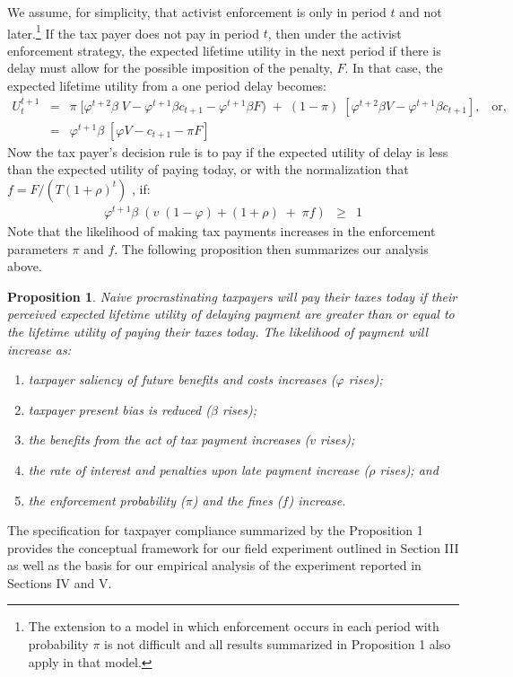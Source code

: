 \documentclass[12pt]{article}
\newtheorem{prop}{Proposition}
\begin{document}
We assume, for simplicity, that activist enforcement is only in period
$t$ and not later.\footnote{The extension to a model in which
  enforcement occurs in each period with probability $\pi$ is not
  difficult and all results summarized in Proposition 1 also apply in
  that model.}  If the tax payer does not pay in period $t$, then
under the activist enforcement strategy, the expected lifetime utility
in the next period if there is delay must allow for the possible
imposition of the penalty, $F$.  In that case, the expected lifetime
utility from a one period delay becomes:
\begin{eqnarray}\label{eq8}
U_t^{t+1} &=& \pi  \; [\varphi^{t+2} \beta \; V - \varphi^{t+1} \beta c_
  {t+1} - \varphi^{t+1} \beta F ) \; +  \; (1-\pi) \;  [\varphi^{t+2} \beta V -
    \varphi^{t+1} \beta c_ {t+1}], \; \; \; \mbox{or}, \nonumber  \\ 
&=& \varphi^{t+1} \beta \; [ \varphi V - c_ {t+1} - \pi F ]
 \end{eqnarray}
Now the tax payer's decision rule is to pay if the expected utility of
delay is less than the expected utility of paying today, or with the
normalization that $f = F/(T(1 + \rho)^{t})$ , if:
\begin{eqnarray}\label{eq9}
\varphi^{t+1} \beta \; (v \; (1-\varphi) + (1 + \rho) \; + \; \pi f)
&\ge& 1
\end{eqnarray}
Note that the likelihood of making tax payments increases in the
enforcement parameters $\pi$ and $f$. The following proposition then 
summarizes our analysis above.
\begin{prop}
Naive procrastinating taxpayers will pay their taxes today if their
perceived expected lifetime utility of delaying payment are greater
than or equal to the lifetime utility of paying their taxes today.
The likelihood of payment will increase as:
\begin{enumerate}
\item taxpayer saliency of future benefits and costs increases
  ($\varphi$ rises);
\item taxpayer present bias is reduced ($\beta$ rises); 
\item the benefits from the act of tax payment increases ($v$ rises);
\item the rate of interest and penalties upon late payment increase
  ($\rho$ rises); and
\item the enforcement probability ($\pi$) and the fines ($f$) increase.
\end{enumerate}
\end{prop}
The specification for taxpayer compliance summarized by the
Proposition 1 provides the conceptual framework for our field
experiment outlined in Section III as well as the basis for our
empirical analysis of the experiment reported in Sections IV and V.
\end{document}
